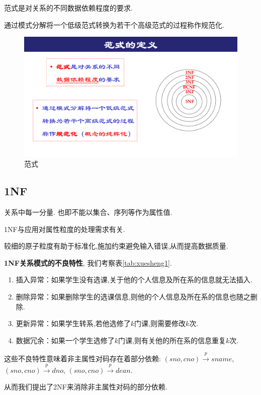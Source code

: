 \begin{definition}[范式]
  范式是对关系的不同数据依赖程度的要求.
\end{definition}

\begin{definition}[规范化]
  通过模式分解将一个低级范式转换为若干个高级范式的过程称作规范化.
\end{definition}

\begin{figure}[H]
    \centering
    \includegraphics[width=.25\textwidth]{./figure/范式.pdf}
    \caption{范式}
\end{figure}

\subsection{1NF}

\begin{definition}[1NF]
  关系中每一分量. 也即不能以集合、序列等作为属性值.
\end{definition}

\begin{remark}
  1NF与应用对属性粒度的处理需求有关.

  较细的原子粒度有助于标准化,施加约束避免输入错误,从而提高数据质量.
\end{remark}

\textbf{1NF关系模式的不良特性}, 我们考察表\ref{tab:xuesheng1}.
\begin{enumerate}
    \item 插入异常：如果学生没有选课,关于他的个人信息及所在系的信息就无法插入.
    \item 删除异常：如果删除学生的选课信息,则他的个人信息及所在系的信息也随之删除.
    \item 更新异常：如果学生转系,若他选修了$k$门课,则需要修改$k$次.
    \item 数据冗余：如果一个学生选修了$k$门课,则有关他的所在系的信息重复$k$次.
\end{enumerate}
这些不良特性意味着非主属性对码存在着部分依赖: $(sno,cno)\overset{p}{\rightarrow} sname$, $(sno,cno)\overset{p}{\rightarrow} dno$, $(sno,cno)\overset{p}{\rightarrow} dean$.

从而我们提出了2NF来消除非主属性对码的部分依赖.

